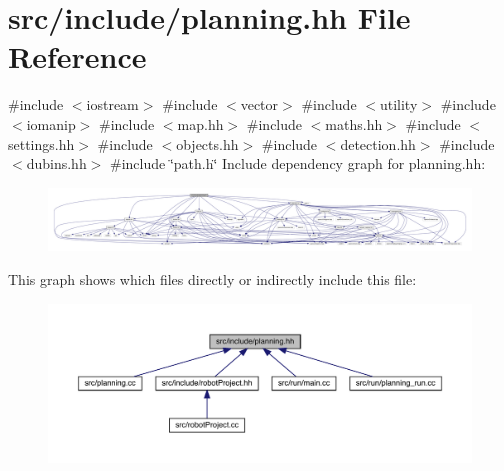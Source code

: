 \hypertarget{planning_8hh}{}\section{src/include/planning.hh File Reference}
\label{planning_8hh}
{\ttfamily \#include $<$iostream$>$}\newline
{\ttfamily \#include $<$vector$>$}\newline
{\ttfamily \#include $<$utility$>$}\newline
{\ttfamily \#include $<$iomanip$>$}\newline
{\ttfamily \#include $<$map.\+hh$>$}\newline
{\ttfamily \#include $<$maths.\+hh$>$}\newline
{\ttfamily \#include $<$settings.\+hh$>$}\newline
{\ttfamily \#include $<$objects.\+hh$>$}\newline
{\ttfamily \#include $<$detection.\+hh$>$}\newline
{\ttfamily \#include $<$dubins.\+hh$>$}\newline
{\ttfamily \#include \char`\"{}path.\+h\char`\"{}}\newline
Include dependency graph for planning.\+hh\+:
\nopagebreak
\begin{figure}[H]
\begin{center}
\leavevmode
\includegraphics[width=350pt]{planning_8hh__incl}
\end{center}
\end{figure}
This graph shows which files directly or indirectly include this file\+:
\nopagebreak
\begin{figure}[H]
\begin{center}
\leavevmode
\includegraphics[width=350pt]{planning_8hh__dep__incl}
\end{center}
\end{figure}
